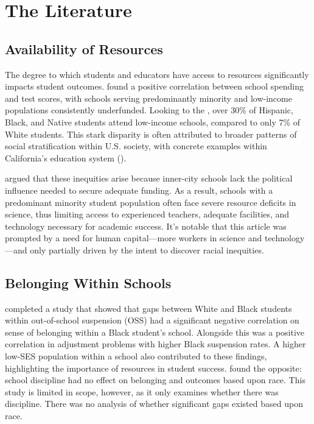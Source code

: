 \documentclass[jou,12pt,floatsintext]{apa7}
\begin{document}
\section{The Literature}
\subsection{Availability of Resources}
The degree to which students and educators have access to resources significantly impacts student outcomes. \textcite{condron_disparities_2003} found a positive correlation between school spending and test scores, with schools serving predominantly minority and low-income populations consistently underfunded. Looking to the \textcite{national_center_for_education_statistics_concentration_2023}, over 30\% of Hispanic, Black, and Native students attend low-income schools, compared to only 7\% of White students. This stark disparity is often attributed to broader patterns of social stratification within U.S. society, with concrete examples within California's education system (\parencite{reed_educational_nodate, kozol_savage_1991}).

\textcite{oakes_multiplying_1990} argued that these inequities arise because inner-city schools lack the political influence needed to secure adequate funding. As a result, schools with a predominant minority student population often face severe resource deficits in science, thus limiting access to experienced teachers, adequate facilities, and technology necessary for academic success. It's notable that this article was prompted by a need for human capital—more workers in science and technology—and only partially driven by the intent to discover racial inequities.

\subsection{Belonging Within Schools}
\textcite{bottiani_multilevel_2017} completed a study that showed that gaps between White and Black students within out-of-school suspension (OSS) had a significant negative correlation on sense of belonging within a Black student's school. Alongside this was a positive correlation in adjustment problems with higher Black suspension rates. A higher low-SES population within a school also contributed to these findings, highlighting the importance of resources in student success. \textcite{king_examination_2011} found the opposite: school discipline had no effect on belonging and outcomes based upon race. This study is limited in scope, however, as it only examines whether there was discipline. There was no analysis of whether significant gaps existed based upon race.
\end{document}
